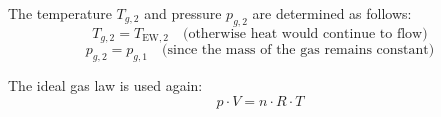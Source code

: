 The temperature \( T_{g,2} \) and pressure \( p_{g,2} \) are determined as follows:  
\[
T_{g,2} = T_{\text{EW},2} \quad \text{(otherwise heat would continue to flow)}
\]  
\[
p_{g,2} = p_{g,1} \quad \text{(since the mass of the gas remains constant)}
\]  

The ideal gas law is used again:  
\[
p \cdot V = n \cdot R \cdot T
\]